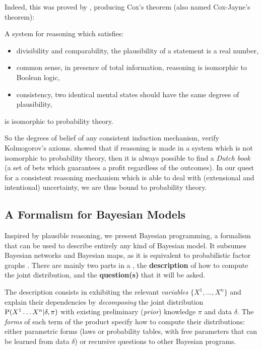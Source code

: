 Indeed, this was proved by \cite{Cox46}, producing Cox's theorem (also named Cox-Jayne's theorem):
\begin{mythm}
A system for reasoning which satisfies:
\begin{itemize}
    \item divisibility and comparability, the plausibility of a statement is a real number,
    \item common sense, in presence of total information, reasoning is isomorphic to Boolean logic,
    \item consistency, two identical mental states should have the same degrees of plausibility,
\end{itemize}
is isomorphic to probability theory.
\end{mythm}
So the degrees of belief of any consistent induction mechanism, verify Kolmogorov's axioms. \cite{DeFinetti37} showed that if reasoning is made in a system which is not isomorphic to probability theory, then it is always possible to find a \textit{Dutch book} (a set of bets which guarantees a profit regardless of the outcomes). In our quest for a consistent reasoning mechanism which is able to deal with (extensional and intentional) uncertainty, we are thus bound to probability theory. %


\subsection{A Formalism for Bayesian Models}
Inspired by plausible reasoning, we present Bayesian programming, a formalism that can be used to describe entirely any kind of Bayesian model. It subsumes Bayesian networks and Bayesian maps, as it is equivalent to probabilistic factor graphs \cite{Diard03}. There are mainly two parts in a , the \textbf{description} of how to compute the joint distribution, and the \textbf{question(s)} that it will be asked. 

The description consists in exhibiting the relevant \textit{variables} $\{X^1,\dots,X^n\}$ and explain their dependencies by \textit{decomposing} the joint distribution $\mathrm{P}(X^1\dots X^n | \delta, \pi)$ with existing preliminary (\textit{prior}) knowledge $\pi$ and data $\delta$. The \textit{forms} of each term of the product specify how to compute their distributions: either parametric forms (laws or probability tables, with free parameters that can be learned from data $\delta$) or recursive questions to other Bayesian programs.

